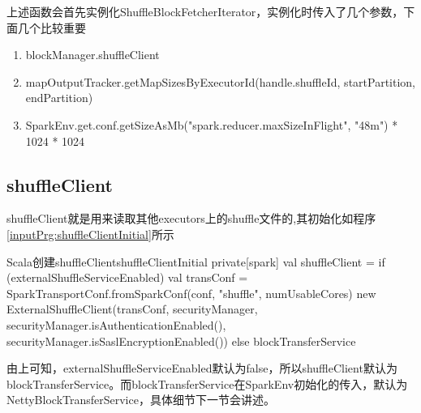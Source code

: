上述函数会首先实例化ShuffleBlockFetcherIterator，实例化时传入了几个参数，下面几个比较重要
\begin{enumerate}[\bfseries 1]
	\item blockManager.shuffleClient
	\item mapOutputTracker.getMapSizesByExecutorId(handle.shuffleId, startPartition, endPartition)
	\item SparkEnv.get.conf.getSizeAsMb("spark.reducer.maxSizeInFlight", "48m") * 1024 * 1024
\end{enumerate}
\subsection{shuffleClient}
shuffleClient就是用来读取其他executors上的shuffle文件的,其初始化如程序\ref{inputPrg:shuffleClientInitial}所示
\begin{codeInput}{Scala}{创建shuffleClient}{shuffleClientInitial}
private[spark] val shuffleClient = if (externalShuffleServiceEnabled) {
  val transConf = SparkTransportConf.fromSparkConf(conf, "shuffle", numUsableCores)
  new ExternalShuffleClient(transConf, securityManager, securityManager.isAuthenticationEnabled(),
  securityManager.isSaslEncryptionEnabled())
} else {
  blockTransferService
}
\end{codeInput}
由上可知，externalShuffleServiceEnabled默认为false，所以shuffleClient默认为blockTransferService。而blockTransferService在SparkEnv初始化的传入，默认为NettyBlockTransferService，具体细节下一节会讲述。
